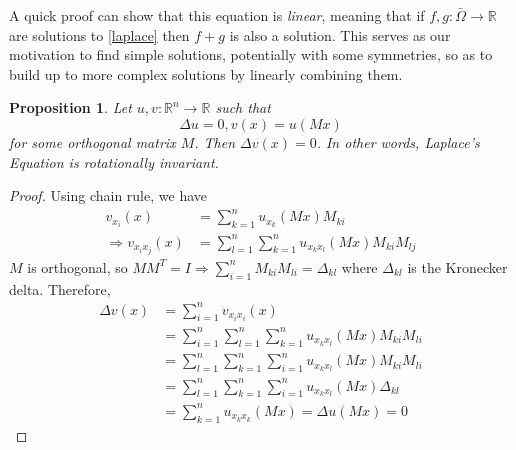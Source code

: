 \documentclass[openany, amssymb, psamsfonts]{amsart}
\newtheorem{prop}{Proposition}[section]
\theoremstyle{definition}
\numberwithin{equation}{section}
\newcommand{\bbr}{\mathbb{R}}
\let\implies\Rightarrow
\begin{document}
A quick proof can show that this equation is \textit{linear}, meaning that if $f, g: \bar{\Omega} \to \bbr$ are solutions to \eqref{laplace} then $f + g$ is also a solution. This serves as our motivation to find simple solutions, potentially with some symmetries, so as to build up to more complex solutions by linearly combining them.

\begin{prop}
    Let $u, v: \bbr^n \to \bbr$ such that \[
        \Delta u = 0, v(x) = u(Mx)
    \] for some orthogonal matrix $M$. Then $\Delta v(x) = 0$. In other words, Laplace's Equation is \textit{rotationally invariant}.
\end{prop}
\begin{proof}
    Using chain rule, we have
    \begin{align*}
        v_{x_i} (x)             & = \sum_{k=1}^{n}u_{x_k}(Mx)M_{ki}                          \\
        \implies v_{x_i x_j}(x) & =  \sum_{l=1}^{n}\sum_{k=1}^{n}u_{x_k x_l}(Mx)M_{ki}M_{lj}
    \end{align*}
    $M$ is orthogonal, so $MM^T = I \implies \sum_{i=1}^{n} M_{ki} M_{li} = \Delta_{kl}$ where $\Delta_{kl}$ is the Kronecker delta. Therefore,
    \begin{align*}
        \Delta v(x) & = \sum_{i=1}^{n}v_{x_i x_i}(x)                                             \\
                    & = \sum_{i=1}^{n} \sum_{l=1}^{n}\sum_{k=1}^{n}u_{x_k x_l}(Mx)M_{ki}M_{li}   \\
                    & = \sum_{l=1}^{n}\sum_{k=1}^{n}  \sum_{i=1}^{n} u_{x_k x_l}(Mx)M_{ki}M_{li} \\
                    & = \sum_{l=1}^{n}\sum_{k=1}^{n}  \sum_{i=1}^{n} u_{x_k x_l}(Mx)\Delta_{kl}  \\
                    & = \sum_{k=1}^{n}u_{x_k x_k}(Mx) = \Delta u(Mx) = 0
    \end{align*}
\end{proof}
\end{document}
